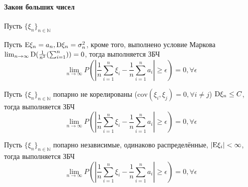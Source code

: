 \documentclass[main.tex]{subfiles}
\begin{document}
\paragraph{Закон больших чисел}
Пусть $\{\xi_n\}_{n\in\mathbb{N}}$
\begin{theorem}
	Пусть $\mathrm{E}\xi_n=a_n,\mathrm{D}\xi_n=\sigma_n^2$, кроме того, выполнено условие Маркова ${\lim_{n\rightarrow\infty}\mathrm{D}(\frac{1}{n^2}(\sum_{i=1}^n)) = 0}$, тогда выполняется ЗБЧ
	$$\lim_{n\rightarrow\infty}P(|\frac{1}{n}\sum_{i=1}^n \xi_i - \frac{1}{n}\sum_{i=1}^n a_i|\geq\epsilon) = 0, \forall \epsilon$$
\end{theorem}

\begin{theorem}
	Пусть $\{\xi_n\}_{n\in\mathbb{N}}$ попарно не корелированы ($\text{cov}(\xi_i,\xi_j)=0,\forall i \neq j$)
	$\mathrm{D}\xi_n \leq C$, тогда выполняется ЗБЧ
	$$\lim_{n\rightarrow\infty}P(|\frac{1}{n}\sum_{i=1}^n \xi_i - \frac{1}{n}\sum_{i=1}^n a_i|\geq\epsilon) = 0, \forall \epsilon$$
\end{theorem}

\begin{theorem}
	Пусть $\{\xi_n\}_{n\in\mathbb{N}}$ попарно независимые, одинаково распределённые, $|\mathrm{E}\xi_i|<\infty$, тогда выполняется ЗБЧ
	$$\lim_{n\rightarrow\infty}P(|\frac{1}{n}\sum_{i=1}^n \xi_i - \frac{1}{n}\sum_{i=1}^n a_i|\geq\epsilon) = 0, \forall \epsilon$$
\end{theorem}
\end{document}
